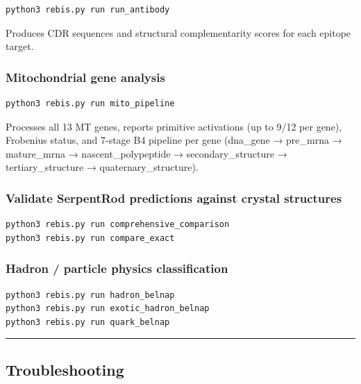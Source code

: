\documentclass[12pt,a4paper]{article}
\begin{document}
\begin{verbatim}
python3 rebis.py run run_antibody
\end{verbatim}

Produces CDR sequences and structural complementarity scores for each
epitope target.

\hypertarget{mitochondrial-gene-analysis}{%
\subsubsection{Mitochondrial gene
analysis}\label{mitochondrial-gene-analysis}}

\begin{verbatim}
python3 rebis.py run mito_pipeline
\end{verbatim}

Processes all 13 MT genes, reports primitive activations (up to 9/12 per
gene), Frobenius status, and 7-stage B4 pipeline per gene (dna\_gene →
pre\_mrna → mature\_mrna → nascent\_polypeptide → secondary\_structure →
tertiary\_structure → quaternary\_structure).

\hypertarget{validate-serpentrod-predictions-against-crystal-structures}{%
\subsubsection{Validate SerpentRod predictions against crystal
structures}\label{validate-serpentrod-predictions-against-crystal-structures}}

\begin{verbatim}
python3 rebis.py run comprehensive_comparison
python3 rebis.py run compare_exact
\end{verbatim}

\hypertarget{hadron-particle-physics-classification}{%
\subsubsection{Hadron / particle physics
classification}\label{hadron-particle-physics-classification}}

\begin{verbatim}
python3 rebis.py run hadron_belnap
python3 rebis.py run exotic_hadron_belnap
python3 rebis.py run quark_belnap
\end{verbatim}

\begin{center}\rule{0.5\linewidth}{0.5pt}\end{center}

\hypertarget{troubleshooting}{%
\subsection{Troubleshooting}\label{troubleshooting}}
\end{document}
